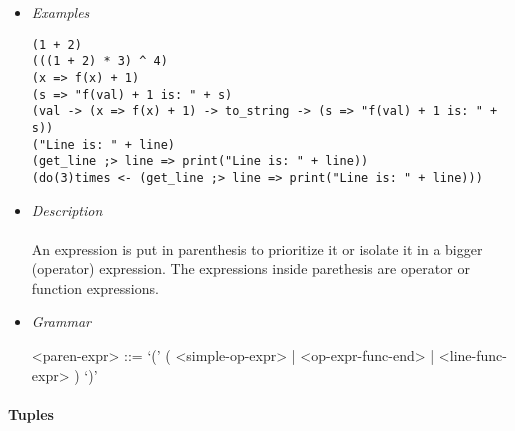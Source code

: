\documentclass{article}
\begin{document}
\begin{itemize}

\item \textit{Examples}
\begin{verbatim}
(1 + 2)
(((1 + 2) * 3) ^ 4)
(x => f(x) + 1)
(s => "f(val) + 1 is: " + s)
(val -> (x => f(x) + 1) -> to_string -> (s => "f(val) + 1 is: " + s))
("Line is: " + line)
(get_line ;> line => print("Line is: " + line))
(do(3)times <- (get_line ;> line => print("Line is: " + line)))
\end{verbatim}

\item \textit{Description} \\\\
An expression is put in parenthesis to prioritize it or isolate it in a bigger
(operator) expression. The expressions inside parethesis are operator
or function expressions.

\item \textit{Grammar}
\begin{grammar}
<paren-expr> ::=
`(' ( <simple-op-expr> | <op-expr-func-end> | <line-func-expr> ) `)' 
\end{grammar}

\end{itemize}

\paragraph{Tuples}
\end{document}
